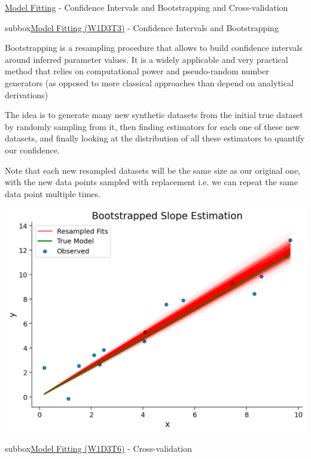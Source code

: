 \begin{textbox}{\href{https://compneuro.neuromatch.io/tutorials/W1D3_ModelFitting/student/W1D3_Tutorial2.html}{Model Fitting} -  Confidence Intervals and Bootstrapping and Cross-validation}
\begin{subbox}{subbox}{\href{https://compneuro.neuromatch.io/tutorials/W1D3_ModelFitting/student/W1D3_Tutorial3.html}{Model Fitting (W1D3T3)} -  Confidence Intervals and Bootstrapping }

\scriptsize

 Bootstrapping is a resampling procedure that allows to build confidence intervals around inferred parameter values.
It is a widely applicable and very practical method that relies on computational power and pseudo-random number generators (as opposed to more classical approaches than depend on analytical derivations)

The idea is to generate many new synthetic datasets from the initial true dataset by randomly sampling from it, then finding estimators for each one of these new datasets, and finally looking at the distribution of all these estimators to quantify our confidence.

Note that each new resampled datasets will be the same size as our original one, with the new data points sampled with replacement i.e. we can repeat the same data point multiple times. 

\centering
\includegraphics[scale=0.2]{Figures/ModelFitting/MFFigure3.png}

\end{subbox}
\begin{subbox}{subbox}{\href{https://compneuro.neuromatch.io/tutorials/W1D3_ModelFitting/student/W1D3_Tutorial6.html}{Model Fitting (W1D3T6)} -  Cross-validation}


\end{subbox}
\end{textbox}
